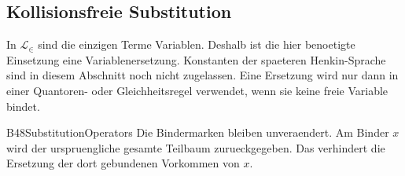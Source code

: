 \subsection{Kollisionsfreie Substitution}

In \(\mathcal L_\in\) sind die einzigen Terme Variablen. Deshalb ist
die hier benoetigte Einsetzung eine Variablenersetzung.
Konstanten der spaeteren Henkin-Sprache sind in diesem Abschnitt
noch nicht zugelassen. Eine Ersetzung wird nur dann in einer
Quantoren- oder Gleichheitsregel verwendet, wenn sie keine freie
Variable bindet.

{B48SubstitutionOperators}{
}
Die Bindermarken bleiben unveraendert. Am Binder \(x\) wird der
urspruengliche gesamte Teilbaum zurueckgegeben. Das verhindert die
Ersetzung der dort gebundenen Vorkommen von \(x\).

